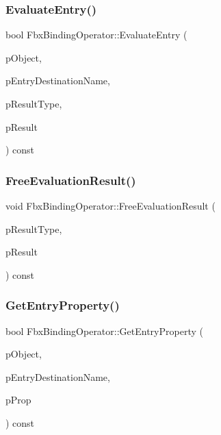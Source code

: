 \subsubsection{\texorpdfstring{Evaluate\+Entry()}{EvaluateEntry()}\hspace{0.1cm}{\footnotesize\ttfamily [2/2]}}
{\footnotesize\ttfamily bool Fbx\+Binding\+Operator\+::\+Evaluate\+Entry (\begin{DoxyParamCaption}\item[{const \hyperlink{class_fbx_object}{Fbx\+Object} $\ast$}]{p\+Object,  }\item[{const char $\ast$}]{p\+Entry\+Destination\+Name,  }\item[{\hyperlink{fbxpropertytypes_8h_a73913a5ddfb20e57c6f25e9e6784bd92}{E\+Fbx\+Type} $\ast$}]{p\+Result\+Type,  }\item[{void $\ast$$\ast$}]{p\+Result }\end{DoxyParamCaption}) const}

\mbox{\label{class_fbx_binding_operator_af7e8559f61c34efa27b1562d386efd2c}} 
\subsubsection{\texorpdfstring{Free\+Evaluation\+Result()}{FreeEvaluationResult()}}
{\footnotesize\ttfamily void Fbx\+Binding\+Operator\+::\+Free\+Evaluation\+Result (\begin{DoxyParamCaption}\item[{\hyperlink{fbxpropertytypes_8h_a73913a5ddfb20e57c6f25e9e6784bd92}{E\+Fbx\+Type}}]{p\+Result\+Type,  }\item[{void $\ast$}]{p\+Result }\end{DoxyParamCaption}) const\hspace{0.3cm}{\ttfamily [protected]}}

\mbox{\label{class_fbx_binding_operator_a9201bfc345f36627b6bace7fa3ccb319}} 
\subsubsection{\texorpdfstring{Get\+Entry\+Property()}{GetEntryProperty()}}
{\footnotesize\ttfamily bool Fbx\+Binding\+Operator\+::\+Get\+Entry\+Property (\begin{DoxyParamCaption}\item[{const \hyperlink{class_fbx_object}{Fbx\+Object} $\ast$}]{p\+Object,  }\item[{const char $\ast$}]{p\+Entry\+Destination\+Name,  }\item[{\hyperlink{class_fbx_property}{Fbx\+Property} \&}]{p\+Prop }\end{DoxyParamCaption}) const}

